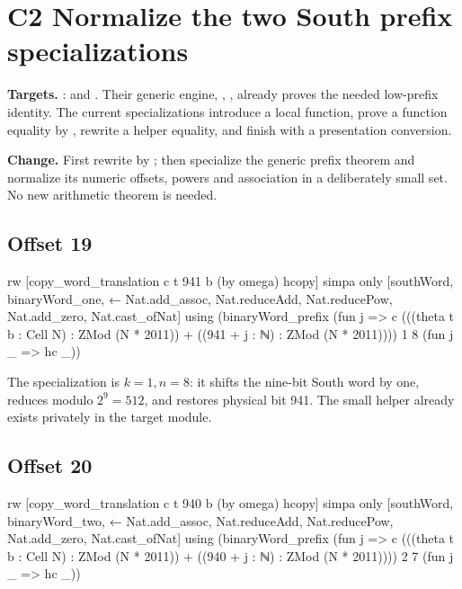 \section{C2 Normalize the two South prefix specializations}
\label{sec:prefix}

\textbf{Targets.} :
 and . Their generic engine,
, , already
proves the needed low-prefix identity. The current specializations introduce
a local function, prove a function equality by , rewrite a
helper equality, and finish with a presentation conversion.

\textbf{Change.} First rewrite by ; then
specialize the generic prefix theorem and normalize its numeric offsets,
powers and association in a deliberately small  set.
No new arithmetic theorem is needed.

\subsection{Offset 19}
\begin{Lean}
  rw [copy_word_translation c t 941 b (by omega) hcopy]
  simpa only [southWord, binaryWord_one, ← Nat.add_assoc,
    Nat.reduceAdd, Nat.reducePow, Nat.add_zero,
    Nat.cast_ofNat] using
    (binaryWord_prefix
      (fun j => c (((theta t b : Cell N) : ZMod (N * 2011)) +
        ((941 + j : ℕ) : ZMod (N * 2011))))
      1 8 (fun j _ => hc _))
\end{Lean}

The specialization is $k=1,n=8$: it shifts the nine-bit South word by one,
reduces modulo $2^9=512$, and restores physical bit 941. The small
 helper already exists privately in the target module.

\subsection{Offset 20}
\begin{Lean}
  rw [copy_word_translation c t 940 b (by omega) hcopy]
  simpa only [southWord, binaryWord_two, ← Nat.add_assoc,
    Nat.reduceAdd, Nat.reducePow, Nat.add_zero,
    Nat.cast_ofNat] using
    (binaryWord_prefix
      (fun j => c (((theta t b : Cell N) : ZMod (N * 2011)) +
        ((940 + j : ℕ) : ZMod (N * 2011))))
      2 7 (fun j _ => hc _))
\end{Lean}

